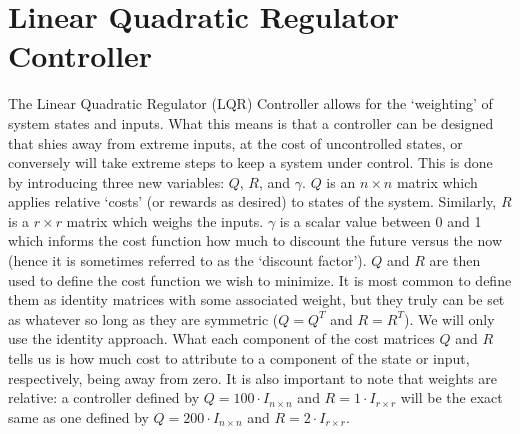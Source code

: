 \FloatBarrier\section{Linear Quadratic Regulator Controller} %
The Linear Quadratic Regulator (LQR) Controller allows for the `weighting' of system states and inputs. What this means is that a controller can be designed that shies away from extreme inputs, at the cost of uncontrolled states, or conversely will take extreme steps to keep a system under control.
This is done by introducing three new variables: $Q$, $R$, and $\gamma$. $Q$ is an $n\times n$ matrix which applies relative `costs' (or rewards as desired) to states of the system. Similarly, $R$ is a $r\times r$ matrix which weighs the inputs. $\gamma$ is a scalar value between 0 and 1 which informs the cost function how much to discount the future versus the now (hence it is sometimes referred to as the `discount factor'). 
$Q$ and $R$ are then used to define the cost function we wish to minimize. It is most common to define them as identity matrices with some associated weight, but they truly can be set as whatever so long as they are symmetric ($Q=Q^T$ and $R=R^T$). We will only use the identity approach. What each component of the cost matrices $Q$ and $R$ tells us is how much cost to attribute to a component of the state or input, respectively, being away from zero. It is also important to note that weights are relative: a controller defined by $Q=100\cdot I_{n\times n}$ and $R=1\cdot I_{r\times r}$ will be the exact same as one defined by $Q=200\cdot I_{n\times n}$ and $R=2\cdot I_{r\times r}$.


